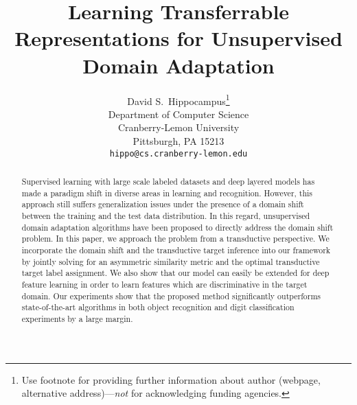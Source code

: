 \documentclass{article}
\title{Learning Transferrable Representations for Unsupervised Domain Adaptation}
\author{
  David S.~Hippocampus\thanks{Use footnote for providing further
    information about author (webpage, alternative
    address)---\emph{not} for acknowledging funding agencies.} \\
  Department of Computer Science\\
  Cranberry-Lemon University\\
  Pittsburgh, PA 15213 \\
  \texttt{hippo@cs.cranberry-lemon.edu} \\
}
\begin{document}
 

\maketitle

\begin{abstract} 
Supervised learning with large scale labeled datasets and deep layered models has made a paradigm shift in diverse areas in learning and recognition. However, this approach still suffers generalization issues under the presence of a domain shift between the training and the test data distribution. In this regard, unsupervised domain adaptation algorithms have been proposed to directly address the domain shift problem. In this paper, we approach the problem from a transductive perspective. We incorporate the domain shift and the transductive target inference into our framework by jointly solving for an asymmetric similarity metric and the optimal transductive target label assignment. We also show that our model can easily be extended for deep feature learning in order to learn features which are discriminative in the target domain. Our experiments show that the proposed method significantly outperforms state-of-the-art algorithms in both object recognition and digit classification experiments by a large margin.
\end{abstract} 
\end{document}
